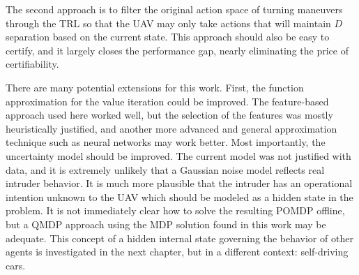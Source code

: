 The second approach is to filter the original action space of turning maneuvers through the TRL so that the UAV may only take actions that will maintain $D$ separation based on the current state.
This approach should also be easy to certify, and it largely closes the performance gap, nearly eliminating the price of certifiability.

There are many potential extensions for this work.
First, the function approximation for the value iteration could be improved.
The feature-based approach used here worked well, but the selection of the features was mostly heuristically justified, and another more advanced and general approximation technique such as neural networks may work better.
Most importantly, the uncertainty model should be improved.
The current model was not justified with data, and it is extremely unlikely that a Gaussian noise model reflects real intruder behavior.
It is much more plausible that the intruder has an operational intention unknown to the UAV which should be modeled as a hidden state in the problem.
It is not immediately clear how to solve the resulting POMDP offline, but a QMDP approach using the MDP solution found in this work may be adequate.
This concept of a hidden internal state governing the behavior of other agents is investigated in the next chapter, but in a different context: self-driving cars.
